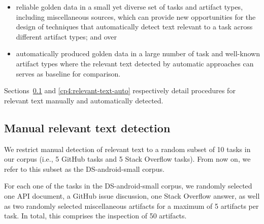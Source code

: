 \begin{itemize}
    \item reliable golden data in a small yet diverse set of tasks and artifact types, including miscellaneous sources, which can provide new opportunities for the design of techniques that automatically detect text relevant to a task across different artifact types; and over
    \item automatically produced golden data in a large number of
    task and well-known artifact types where the relevant text detected by automatic approaches can serves as
    baseline for comparison.
\end{itemize}


Sections~\ref{cp4:relevant-text-manual} and \ref{cp4:relevant-text-auto} respectively detail procedures for 
relevant text manually and automatically detected.





\subsection{Manual relevant text detection}
\label{cp4:relevant-text-manual}



We restrict manual detection of relevant text 
to a random subset of 10 tasks in our corpus (i.e., 5 GitHub tasks and 5 Stack Overflow tasks). 
From now on, we refer to this subset as the \acs{DS-android-small} corpus.


For each one of the tasks in the \acs{DS-android-small} corpus, we randomly selected 
one API document, a GitHub issue discussion, one Stack Overflow answer, as well as two randomly selected miscellaneous artifacts for a maximum of 5 artifacts per task.
In total, this comprises the inspection of 50 artifacts.




